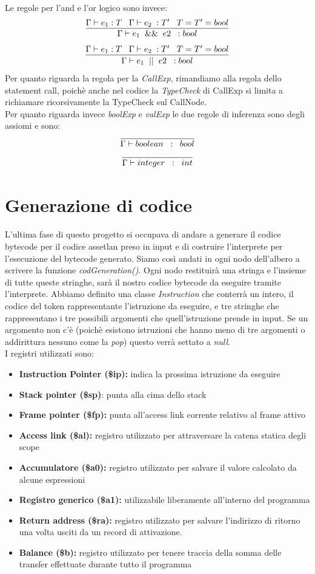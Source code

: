 \documentclass[12pt, a4paper]{report}
\begin{document}
Le regole per l'and e l'or logico sono invece:
\[ \infer{\Gamma \vdash e_1\;\; \&\&\;\; e2 \;\; : bool}{\Gamma \vdash e_1 :T \;\;\; \Gamma \vdash e_2 \; : T' \;\;\; T=T'=bool} \]
\[ \infer{\Gamma \vdash e_1 \;\; ||\;\; e2 \;\; : bool}{\Gamma \vdash e_1 :T \;\;\; \Gamma \vdash e_2 \; : T' \;\;\; T=T'=bool} \]
Per quanto riguarda la regola per la \emph{CallExp}, rimandiamo alla regola dello statement call, poichè anche nel codice la \emph{TypeCheck} di CallExp si limita a richiamare ricorsivamente la TypeCheck sul CallNode.\\
Per quanto riguarda invece \emph{boolExp} e \emph{valExp} le due regole di inferenza sono degli assiomi e sono:
\[ \infer{\Gamma \vdash boolean \;\; : \;\; bool}{} \]
\[ \infer{\Gamma \vdash integer \;\; : \;\; int}{} \]


\chapter{Generazione di codice}
L'ultima fase di questo progetto si occupava di andare a generare il codice bytecode per il codice assetlan preso in input e di costruire l'interprete per l'esecuzione del bytecode generato. Siamo così andati in ogni nodo dell'albero a scrivere la funzione \emph{codGeneration()}. Ogni nodo restituirà una stringa e l'insieme di tutte queste stringhe, sarà il nostro codice bytecode da eseguire tramite l'interprete. Abbiamo definito una classe \emph{Instruction} che conterrà un intero, il codice del token rappresentante l'istruzione da eseguire, e tre stringhe che rappresentano i tre possibili argomenti che quell'istruzione prende in input. Se un argomento non c'è (poichè esistono istruzioni che hanno meno di tre argomenti o addirittura nessuno come la \emph{pop}) questo verrà settato a \emph{null}.\\
I registri utilizzati sono:
\begin{itemize}
    \item \textbf{Instruction Pointer (\$ip):} indica la prossima istruzione da eseguire
    \item \textbf{Stack pointer (\$sp)}: punta alla cima dello stack
    \item \textbf{Frame pointer (\$fp):} punta all’access link corrente relativo al frame attivo
    \item \textbf{Access link (\$al):} registro utilizzato per attraversare la catena statica degli scope
    \item \textbf{Accumulatore (\$a0):} registro utilizzato per salvare il valore calcolato da alcune espressioni
    \item \textbf{Registro generico (\$a1):} utilizzabile liberamente all’interno del programma
    \item \textbf{Return address (\$ra):} registro utilizzato per salvare l’indirizzo di ritorno una volta usciti da un
    record di attivazione.
    \item \textbf{Balance (\$b):} registro utilizzato per tenere traccia della somma delle transfer effettuate durante tutto il programma 
\end{itemize}
\end{document}
